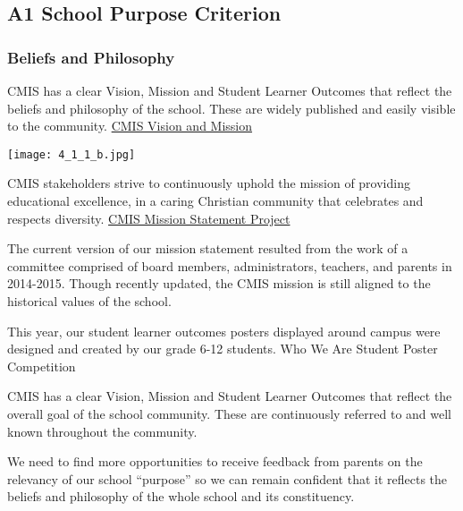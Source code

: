 \subsection{A1 School Purpose Criterion}
\subsubsection{Beliefs and Philosophy}



\begin{findings}
CMIS has a clear Vision, Mission and Student Learner Outcomes that reflect the beliefs and philosophy of the school. These are widely published and easily visible to the community. \href{http://cmis.ac.th/about/vision}{CMIS Vision and Mission}
 
{\centering\texttt{[image: 4\_1\_1\_b.jpg]}}

CMIS stakeholders strive to continuously uphold the mission of providing educational excellence, in a caring Christian community that celebrates and respects diversity. \href{https://docs.google.com/a/cmis.ac.th/presentation/d/1EJ3zT-xwUj2W--v5mTN6xWOqewtvhXrhTxXuoR1HyAg/edit?usp=sharing}{CMIS Mission Statement Project} 

The current version of our mission statement resulted from the work of a committee comprised of board members, administrators, teachers, and parents in 2014-2015. Though recently updated, the CMIS mission is still aligned to the historical values of the school.

This year, our student learner outcomes posters displayed around campus were designed and created by our grade 6-12 students. Who We Are Student Poster Competition 


CMIS has a clear Vision, Mission and Student Learner Outcomes that reflect the overall goal of the school community. These are continuously referred to and well known throughout the community. 

We need to find more opportunities to receive feedback from parents on the relevancy of our school “purpose” so we can remain confident that it reflects the beliefs and philosophy of the whole school and its constituency.
\end{findings}

